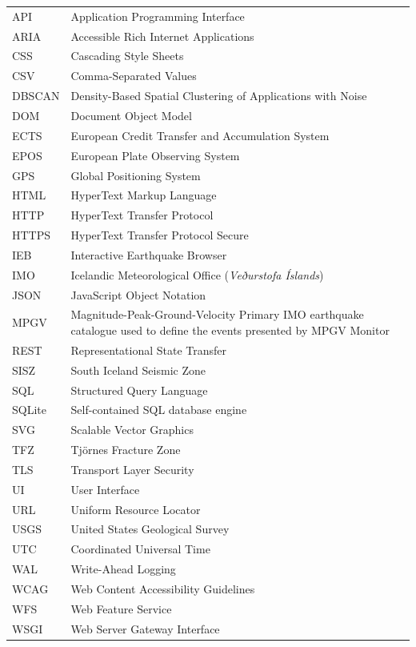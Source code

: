 \documentclass[12pt]{article}
\begin{document}
\begin{tabular}{@{}p{2.0cm}p{12.5cm}@{}}
API   & Application Programming Interface \\
ARIA  & Accessible Rich Internet Applications \\
CSS   & Cascading Style Sheets \\
CSV   & Comma-Separated Values \\
DBSCAN & Density-Based Spatial Clustering of Applications with Noise \\
DOM   & Document Object Model \\
ECTS  & European Credit Transfer and Accumulation System \\
EPOS  & European Plate Observing System \\
GPS   & Global Positioning System \\
HTML  & HyperText Markup Language \\
HTTP  & HyperText Transfer Protocol \\
HTTPS & HyperText Transfer Protocol Secure \\
IEB   & Interactive Earthquake Browser \\
IMO   & Icelandic Meteorological Office (\textit{Veðurstofa Íslands}) \\
JSON  & JavaScript Object Notation \\
MPGV  & Magnitude-Peak-Ground-Velocity Primary IMO earthquake catalogue used to define the events presented by MPGV Monitor \\
REST  & Representational State Transfer \\
SISZ  & South Iceland Seismic Zone \\
SQL   & Structured Query Language \\
SQLite & Self-contained SQL database engine \\
SVG   & Scalable Vector Graphics \\
TFZ   & Tjörnes Fracture Zone \\
TLS   & Transport Layer Security \\
UI    & User Interface \\
URL   & Uniform Resource Locator \\
USGS  & United States Geological Survey \\
UTC   & Coordinated Universal Time \\
WAL   & Write-Ahead Logging \\
WCAG  & Web Content Accessibility Guidelines \\
WFS   & Web Feature Service \\
WSGI  & Web Server Gateway Interface \\
\end{tabular}
\end{document}
